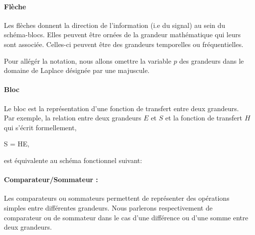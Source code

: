 \paragraph{Flèche}
Les flèches donnent la direction de l'information (i.e du signal) au sein du schéma-blocs. 
Elles peuvent être ornées de la grandeur mathématique qui leurs sont associée. 
Celles-ci peuvent être des grandeurs temporelles ou fréquentielles. 
\begin{center}
\end{center}
Pour allégér la notation, nous allons omettre la variable $p$ des grandeurs 
dans le domaine de Laplace désignée par une majuscule.

\paragraph{Bloc}

Le bloc est la représentation d'une fonction de transfert entre deux grandeurs.
Par exemple, la relation entre deux grandeurs $E$ et $S$ et la fonction de transfert $H$
qui s'écrit formellement, 
\begin{bequation}
S = HE,\label{eq-ES}
\end{bequation}

est équivalente au schéma fonctionnel suivant:

\begin{center}
\end{center}


\paragraph{Comparateur/Sommateur :}

Les comparateurs ou sommateurs permettent de représenter des opérations 
simples entre différentes grandeurs.
Nous parlerons respectivement de comparateur ou de sommateur dans le cas 
d'une différence ou d'une somme entre deux grandeurs. 


